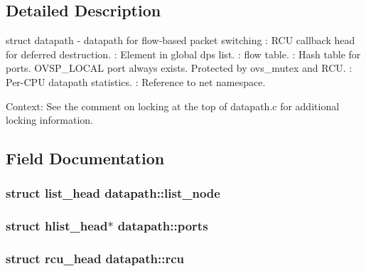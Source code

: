 \subsection{Detailed Description}
struct datapath -\/ datapath for flow-\/based packet switching \+: R\+C\+U callback head for deferred destruction. \+: Element in global \textquotesingle{}dps\textquotesingle{} list. \+: flow table. \+: Hash table for ports. O\+V\+S\+P\+\_\+\+L\+O\+C\+A\+L port always exists. Protected by ovs\+\_\+mutex and R\+C\+U. \+: Per-\/\+C\+P\+U datapath statistics. \+: Reference to net namespace.

Context\+: See the comment on locking at the top of datapath.\+c for additional locking information. 

\subsection{Field Documentation}
\hypertarget{structdatapath_ac5f44be07025a2addb5c393fba822000}{}
\subsubsection[{list\+\_\+node}]{\setlength{\rightskip}{0pt plus 5cm}struct list\+\_\+head datapath\+::list\+\_\+node}\label{structdatapath_ac5f44be07025a2addb5c393fba822000}
\hypertarget{structdatapath_abb0de528545b312de283b571cb6c4ede}{}
\subsubsection[{ports}]{\setlength{\rightskip}{0pt plus 5cm}struct hlist\+\_\+head$\ast$ datapath\+::ports}\label{structdatapath_abb0de528545b312de283b571cb6c4ede}
\hypertarget{structdatapath_af487ac38fa868c398dd248f1956b7a35}{}
\subsubsection[{rcu}]{\setlength{\rightskip}{0pt plus 5cm}struct rcu\+\_\+head datapath\+::rcu}\label{structdatapath_af487ac38fa868c398dd248f1956b7a35}
\hypertarget{structdatapath_a26ff295c711206c8177cdc89150c6a4a}{}
